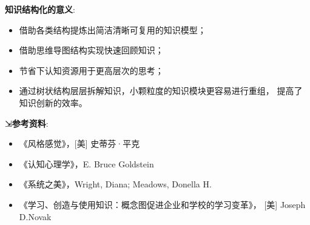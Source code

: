 \documentclass[../main.tex]{subfiles}
\begin{document}
\textbf{知识结构化的意义}:
%
\begin{itemize}
  \item 借助各类结构提炼出简洁清晰可复用的知识模型；
  \item 借助思维导图结构实现快速回顾知识；
  \item 节省下认知资源用于更高层次的思考；
  \item 通过树状结构层层拆解知识，小颗粒度的知识模块更容易进行重组，
    提高了知识创新的效率。
\end{itemize}
%
⇲\textbf{参考资料}:
%
\begin{itemize}
  \item 《风格感觉》，[美] 史蒂芬·平克
  \item 《认知心理学》，E. Bruce Goldstein
  \item 《系统之美》，Wright, Diana; Meadows, Donella H.
  \item 《学习、创造与使用知识：概念图促进企业和学校的学习变革》，
    [美] Joseph D.Novak
\end{itemize}
%
\end{document}
